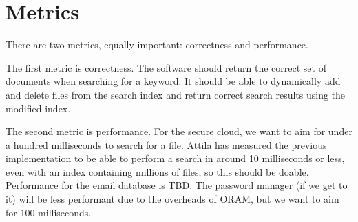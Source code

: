 \section{Metrics}

There are two metrics, equally important: correctness and performance.


The first metric is correctness.
The software should return the correct set of documents when searching for a keyword.
It should be able to dynamically add and delete files from the search index and return correct search results using the modified index.


The second metric is performance.
For the secure cloud, we want to aim for under a hundred milliseconds to search for a file. %
Attila has measured the previous implementation to be able to perform a search in around 10 milliseconds or less, even with an index containing millions of files, so this should be doable.
Performance for the email database is TBD.
The password manager (if we get to it) will be less performant due to the overheads of ORAM, but we want to aim for 100 milliseconds.